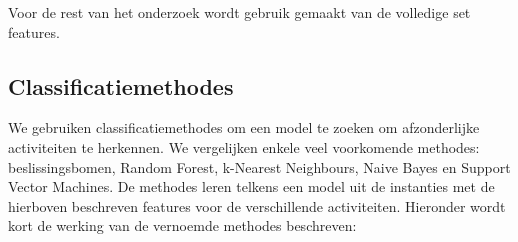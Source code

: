 \documentclass{article}
\begin{document}
Voor de rest van het onderzoek wordt gebruik gemaakt van de volledige set features.



\subsection{Classificatiemethodes}

We gebruiken classificatiemethodes om een model te zoeken om afzonderlijke activiteiten te herkennen. We vergelijken enkele veel voorkomende methodes: beslissingsbomen, Random Forest, k-Nearest Neighbours, Naive Bayes en Support Vector Machines. De methodes leren telkens een model uit de instanties met de hierboven beschreven features voor de verschillende activiteiten. Hieronder wordt kort de werking van de vernoemde methodes beschreven:
\end{document}
